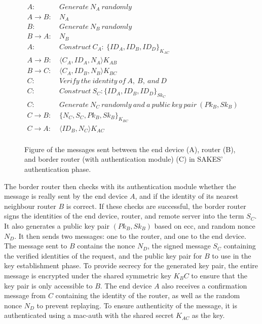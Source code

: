 \begin{figure}[h]
\begin{tcolorbox}[title=Authentication in SAKES]
\begin{align*}
A:\ & Generate\ N_A\ randomly\\
A \rightarrow B:\ & N_A\\
B:\ & Generate\ N_B\ randomly\\
B \rightarrow A:\ & N_B\\
A:\ & Construct\ C_{A}:\ \{ID_A, ID_B, ID_D\}_{K_{AC}}\\
A \rightarrow B:\ & \langle{C_A, ID_A, N_A}\rangle{K_{AB}}\\
B \rightarrow C:\ & \langle{C_A, ID_B, N_B}\rangle{K_{BC}}\\
C:\ & Verify\ the\ identity\ of\ A,\ B,\ and\ D\\
C: \ & Construct\ S_C: \{ID_A, ID_B, ID_D\}_{Sk_{C}}\\
C:\ & Generate\ N_C\ randomly\ and\ a\ public\ key\ pair\ (Pk_B, Sk_B)\\
C \rightarrow B:\ & \{N_C, S_C, Pk_B, Sk_B\}_{K_{BC}}\\
C \rightarrow A:\ & \langle{ID_B, N_C}\rangle{K_{AC}}\\
\end{align*}
\end{tcolorbox}
\caption{Figure of the messages sent between the end device (A), router (B), and border router (with authentication module) (C) in SAKES' authentication phase.}
\label{fig:sakes-auth}
\end{figure}

The border router then checks with its authentication module whether the message is really sent by the end device $A$, and if the identity of its nearest neighbour router $B$ is correct. If these checks are successful, the border router signs the identities of the end device, router, and remote server into the term $S_C$. It also generates a public key pair $(Pk_B, Sk_B)$ based on \gls{ecc}, and random nonce $N_D$. It then sends two messages: one to the router, and one to the end device. The message sent to $B$ contains the nonce $N_D$, the signed message $S_C$ containing the verified identities of the request, and the public key pair for $B$ to use in the key establishment phase. To provide secrecy for the generated key pair, the entire message is encrypted under the shared symmetric key $K_BC$ to ensure that the key pair is only accessible to $B$. The end device $A$ also receives a confirmation message from $C$ containing the identity of the router, as well as the random nonce $N_D$ to prevent replaying. To ensure authenticity of the message, it is authenticated using a \gls{mac-auth} with the shared secret $K_{AC}$ as the key.

